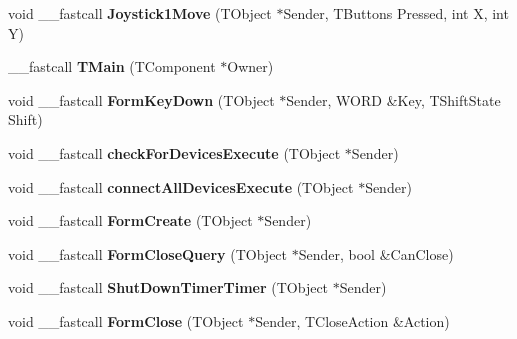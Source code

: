 \begin{DoxyCompactItemize}
\item 
void \+\_\+\+\_\+fastcall {\bfseries Joystick1\+Move} (T\+Object $\ast$Sender, T\+Buttons Pressed, int X, int Y)\hypertarget{class_t_main_abbf08fd7b1c152270750276f9e78bdd9}{}\label{class_t_main_abbf08fd7b1c152270750276f9e78bdd9}

\item 
\+\_\+\+\_\+fastcall {\bfseries T\+Main} (T\+Component $\ast$Owner)\hypertarget{class_t_main_a7b9407ff65dfb1db1922b7575b198091}{}\label{class_t_main_a7b9407ff65dfb1db1922b7575b198091}

\item 
void \+\_\+\+\_\+fastcall {\bfseries Form\+Key\+Down} (T\+Object $\ast$Sender, W\+O\+RD \&Key, T\+Shift\+State Shift)\hypertarget{class_t_main_aea6d7801eb6a6f93bdb1d931837da259}{}\label{class_t_main_aea6d7801eb6a6f93bdb1d931837da259}

\item 
void \+\_\+\+\_\+fastcall {\bfseries check\+For\+Devices\+Execute} (T\+Object $\ast$Sender)\hypertarget{class_t_main_ab2f57311a5c6a7f6db28e350d4217e84}{}\label{class_t_main_ab2f57311a5c6a7f6db28e350d4217e84}

\item 
void \+\_\+\+\_\+fastcall {\bfseries connect\+All\+Devices\+Execute} (T\+Object $\ast$Sender)\hypertarget{class_t_main_a3ca61fcbcc798d8dd9c44180b51f9657}{}\label{class_t_main_a3ca61fcbcc798d8dd9c44180b51f9657}

\item 
void \+\_\+\+\_\+fastcall {\bfseries Form\+Create} (T\+Object $\ast$Sender)\hypertarget{class_t_main_abaef83b8d5dbac96fbd3d32e44542ac2}{}\label{class_t_main_abaef83b8d5dbac96fbd3d32e44542ac2}

\item 
void \+\_\+\+\_\+fastcall {\bfseries Form\+Close\+Query} (T\+Object $\ast$Sender, bool \&Can\+Close)\hypertarget{class_t_main_a0fef10fe4d400a404ccb996d2a02491f}{}\label{class_t_main_a0fef10fe4d400a404ccb996d2a02491f}

\item 
void \+\_\+\+\_\+fastcall {\bfseries Shut\+Down\+Timer\+Timer} (T\+Object $\ast$Sender)\hypertarget{class_t_main_a61e6814b219c347b3c0b940b033c899c}{}\label{class_t_main_a61e6814b219c347b3c0b940b033c899c}

\item 
void \+\_\+\+\_\+fastcall {\bfseries Form\+Close} (T\+Object $\ast$Sender, T\+Close\+Action \&Action)\hypertarget{class_t_main_ad9ae00f5fad754391b61dcc752af2a92}{}\label{class_t_main_ad9ae00f5fad754391b61dcc752af2a92}


\end{DoxyCompactItemize}
